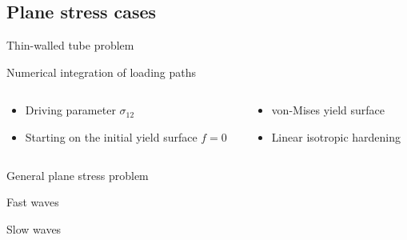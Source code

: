 \subsection{Plane stress cases}
\begin{frame}{Thin-walled tube problem}
  \begin{footnotesize}
    \begin{block}{Numerical integration of loading paths}
      \begin{columns}
        \begin{column}{0.5\textwidth}
          \begin{itemize}
          \item Driving parameter $\sigma_{12}$
          \item Starting on the initial yield surface $f=0$
          \end{itemize}
        \end{column}
        \begin{column}{0.5\textwidth}
          \begin{itemize}
          \item von-Mises yield surface
          \item Linear isotropic hardening
          \end{itemize}
        \end{column}
      \end{columns}
    \end{block}  
  \end{footnotesize}
  \vspace{-0.25cm}
  \begin{block}{}
    \centering
      
  \end{block}
\end{frame}

\begin{frame}{General plane stress problem}
  \begin{block}{Fast waves}
    \vspace{-0.5cm}
    \centering
    
  \end{block}\pause
  \begin{block}{Slow waves}
    \vspace{-0.5cm}
    \centering
    
  \end{block}
\end{frame}

